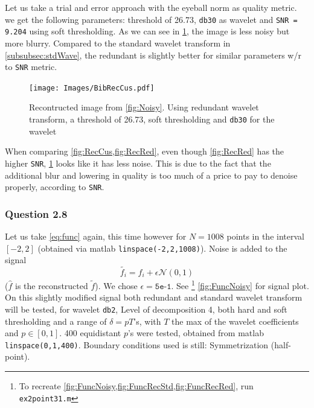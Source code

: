 \documentclass[a4paper]{article}
\begin{document}
	Let us take a trial and error approach with the eyeball norm as quality metric. we get the following parameters: threshold of 26.73, \texttt{db30} as wavelet and \texttt{SNR = 9.204} using soft thresholding. As we can see in \cref{fig:RecCus}, the image is less noisy but more blurry. Compared to the standard wavelet transform in \cref{subsubsec:stdWave}, the redundant is slightly better for similar parameters w/r to \texttt{SNR} metric.

    \begin{figure}[H]
	\centering
	\texttt{[image: Images/BibRecCus.pdf]}
	\caption{Recontructed image from \cref{fig:Noisy}. Using redundant wavelet transform, a threshold of 26.73, soft thresholding and \texttt{db30} for the wavelet}
	\label{fig:RecCus}
\end{figure}

	 When comparing \cref{fig:RecCus,fig:RecRed}, even though \cref{fig:RecRed} has the higher \texttt{SNR}, \cref{fig:RecCus} looks like it has less noise. This is due to the fact that the additional blur and lowering in quality is too much of a price to pay to denoise properly, according to \texttt{SNR}.

    \subsubsection{Question 2.8}

	Let us take \cref{eq:func} again, this time however for $N=1008$ points in the interval $[-2,2]$ (obtained via matlab \texttt{linspace(-2,2,1008)}). Noise is added to the signal 
	\begin{equation} \label{eq:funcNoise}
		\tilde{f_i} = f_i + \epsilon \mathcal{N}(0,1)
	\end{equation}
	($\hat{f}$ is the reconstructed $\tilde{f}$). We chose $\epsilon = \texttt{5e-1}$. See \footnote{To recreate \cref{fig:FuncNoisy,fig:FuncRecStd,fig:FuncRecRed}, run \texttt{ex2point31.m}} \cref{fig:FuncNoisy} for signal plot.\\
	
	On this slightly modified signal both redundant and standard wavelet transform will be tested, for wavelet \texttt{db2}, Level of decomposition 4, both hard and soft thresholding and a range of $\delta = p T$'s, with $T$ the max of the wavelet coefficients and $p \in [0,1]$. 400 equidistant $p$'s were tested, obtained from matlab \texttt{linspace(0,1,400)}. Boundary conditions used is still: Symmetrization (half-point). \\
	
\end{document}
